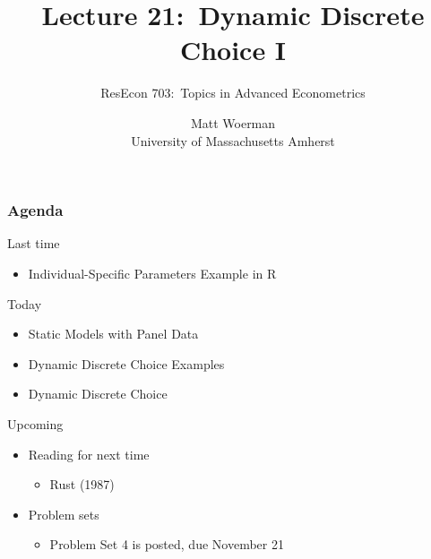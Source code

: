 \documentclass{beamer}
\title[Lecture 21:\ Dynamic Discrete Choice I]{Lecture 21:\ Dynamic Discrete Choice I}
\author[ResEcon 703:\ Advanced Econometrics]{ResEcon 703:\ Topics in Advanced Econometrics}
\date{Matt Woerman\\University of Massachusetts Amherst}
\begin{document}
{ 
\begin{frame}[noframenumbering]
    \titlepage
\end{frame}
}

\begin{frame}\frametitle{Agenda}
    Last time
    \begin{itemize}
        \item Individual-Specific Parameters Example in R
    \end{itemize}
    \vspace{2ex}
    Today
    \begin{itemize}
    	\item Static Models with Panel Data
    	\item Dynamic Discrete Choice Examples
        \item Dynamic Discrete Choice 
    \end{itemize}
    \vspace{2ex}
    Upcoming
    \begin{itemize}
        \item Reading for next time
        \begin{itemize}
            \item Rust (1987)
        \end{itemize}
        \item Problem sets
        \begin{itemize}
            \item Problem Set 4 is posted, due November 21
        \end{itemize}
    \end{itemize}
\end{frame}
\end{document}
